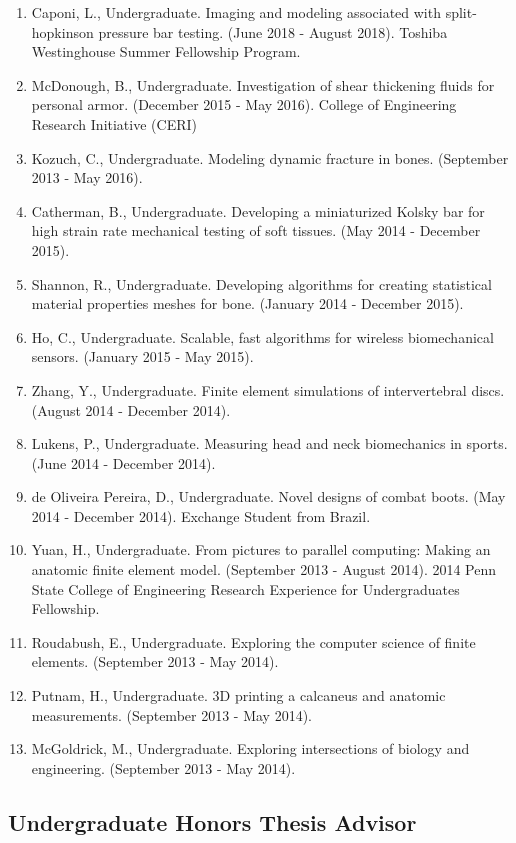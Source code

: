 \documentclass[
]{article}
\begin{document}
\begin{enumerate}
  \def\labelenumi{\arabic{enumi}.}
    \item Caponi, L., Undergraduate. Imaging and modeling associated with split-hopkinson pressure bar testing. (June 2018 - August 2018). Toshiba Westinghouse Summer Fellowship Program.
    \item McDonough, B., Undergraduate. Investigation of shear thickening fluids for personal armor. (December 2015 - May 2016). College of Engineering Research Initiative (CERI)
    \item Kozuch, C., Undergraduate. Modeling dynamic fracture in bones. (September 2013 - May 2016).
    \item Catherman, B., Undergraduate. Developing a miniaturized Kolsky bar for high strain rate mechanical testing of soft tissues. (May 2014 - December 2015).
    \item Shannon, R., Undergraduate. Developing algorithms for creating statistical material properties meshes for bone. (January 2014 - December 2015).
    \item Ho, C., Undergraduate. Scalable, fast algorithms for wireless biomechanical sensors. (January 2015 - May 2015).
    \item Zhang, Y., Undergraduate. Finite element simulations of intervertebral discs. (August 2014 - December 2014).
    \item Lukens, P., Undergraduate. Measuring head and neck biomechanics in sports. (June 2014 - December 2014).
    \item de Oliveira Pereira, D., Undergraduate. Novel designs of combat boots. (May 2014 - December 2014). Exchange Student from Brazil.
    \item Yuan, H., Undergraduate. From pictures to parallel computing: Making an anatomic finite element model. (September 2013 - August 2014). 2014 Penn State College of Engineering Research Experience for Undergraduates Fellowship.
    \item Roudabush, E., Undergraduate. Exploring the computer science of finite elements. (September 2013 - May 2014).
    \item Putnam, H., Undergraduate. 3D printing a calcaneus and anatomic measurements. (September 2013 - May 2014).
    \item McGoldrick, M., Undergraduate. Exploring intersections of biology and engineering. (September 2013 - May 2014).
\end{enumerate}

\subsection{Undergraduate Honors Thesis Advisor}\label{undergraduate-honors-thesis-advisor}
\end{document}
